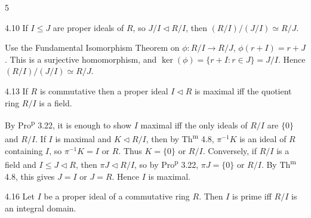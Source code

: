 \documentclass[8pt]{extarticle}
\makeatletter
\renewenvironment{proof}[1][\proofname]{%
  \par%
  \pushQED{\qed}%
  \normalfont
  \topsep=2pt\partopsep=0pt\parsep=0pt\itemsep=0pt%
  \trivlist
  \item[\hskip\labelsep\itshape #1\@addpunct{.}]\ignorespaces
}{%
  \popQED\endtrivlist\@endpefalse
  \vspace{-1pt}%
}
\makeatother
\begin{document}
\begin{multicols*}{5}
        \begin{theorem}{4.10}
            If \(I\le J\) are proper ideals of \(R\), so \(J/I\lhd R/I\), then \((R/I)/(J/I)\simeq R/J\).
            \begin{center}
                \vspace{-6pt}
                \vspace{-12pt}
            \end{center}
        \end{theorem}

        \begin{proof}
            Use the Fundamental Isomorphism Theorem on \(\phi:R/I\to R/J\), \(\phi(r+I)=r+J\). This is a surjective homomorphism, and \(\ker(\phi)=\{r+I:r\in J\}=J/I\). Hence \((R/I)/(J/I)\simeq R/J\).
        \end{proof}

        \begin{corollary}{4.13}
            If \(R\) is commutative then a proper ideal \(I\lhd R\) is maximal iff the quotient ring \(R/I\) is a field.
        \end{corollary}

        \begin{proof}
            By Pro\textsuperscript{p} 3.22, it is enough to show \(I\) maximal iff the only ideals of \(R/I\) are \(\{0\}\) and \(R/I\). If \(I\) is maximal and \(K\lhd R/I\), then by Th\textsuperscript{m} 4.8, \(\pi^{-1}K\) is an ideal of \(R\) containing \(I\), so \(\pi^{-1}K=I\) or \(R\). Thus \(K=\{0\}\) or \(R/I\). Conversely, if \(R/I\) is a field and \(I\le J\lhd R\), then \(\pi J\lhd R/I\), so by Pro\textsuperscript{p} 3.22, \(\pi J=\{0\}\) or \(R/I\). By Th\textsuperscript{m} 4.8, this gives \(J=I\) or \(J=R\). Hence \(I\) is maximal.
        \end{proof}

        \begin{theorem}{4.16}
            Let \(I\) be a proper ideal of a commutative ring \(R\). Then \(I\) is prime iff \(R/I\) is an integral domain.
        \end{theorem}


\end{multicols*}
\end{document}
